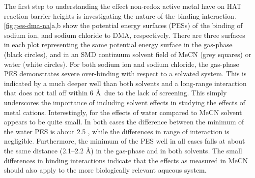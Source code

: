 The first step to understanding the effect non-redox active metal have on HAT
reaction barrier heights is investigating the nature of the binding
interaction. \ref{fig:pes-dma-na}a,b show the potential energy surfaces (PESs)
of the binding of sodium ion, and sodium chloride to DMA, respectively. There
are three surfaces in each plot representing the same potential energy surface
in the gas-phase (black circles), and in an SMD\cite{Marenich2009} continuum
solvent field of MeCN (grey squares) or water (white circles). For both sodium
ion and sodium chloride, the gas-phase PES demonstrates severe over-binding
with respect to a solvated system. This is indicated by a much deeper well than
both solvents and a long-range interaction that does not tail off within 6
\AA\ due to the lack of screening. This simply underscores the importance
of including solvent effects in studying the effects of metal cations.
Interestingly, for the effects of water compared to MeCN solvent appears to be
quite small. In both cases the difference between the minimum of the water PES
is about 2.5 \kcalmol, while the differences in range of interaction is
negligible. Furthermore, the minimum of the PES well in all cases falls at
about the same distance (2.1--2.2 \AA) in the gas-phase and in both solvents.
The small differences in binding interactions indicate that the effects as
measured in MeCN should also apply to the more biologically relevant aqueous
system. 

